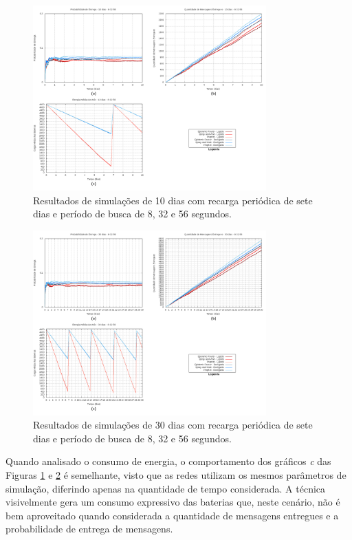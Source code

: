 \begin{figure}
\centering
\includegraphics[width=0.8\textwidth]{figuras/cap_5/graficos/8_32_56/MessageDeliveryReport_10_8-32-56_withRecharge_604800.png}
\caption{Resultados de simulações de 10 dias com recarga periódica de sete dias e período de busca de 8, 32 e 56 segundos.}
\label{10dias_8-32-56_comRecarga}
\end{figure}

\begin{figure}
\centering
\includegraphics[width=0.8\textwidth]{figuras/cap_5/graficos/8_32_56/MessageDeliveryReport_30_8-32-56_withRecharge_604800.png}
\caption{Resultados de simulações de 30 dias com recarga periódica de sete dias e período de busca de 8, 32 e 56 segundos.}
\label{30dias_8-32-56_comRecarga}
\end{figure}

Quando analisado o consumo de energia, o comportamento dos gráficos \emph{c} das Figuras \ref{10dias_8-32-56_comRecarga} e \ref{30dias_8-32-56_comRecarga} é semelhante, visto que as redes utilizam os mesmos parâmetros de simulação, diferindo apenas na quantidade de tempo considerada. A técnica visivelmente gera um consumo expressivo das baterias que, neste cenário, não é bem aproveitado quando considerada a quantidade de mensagens entregues e a probabilidade de entrega de mensagens.

